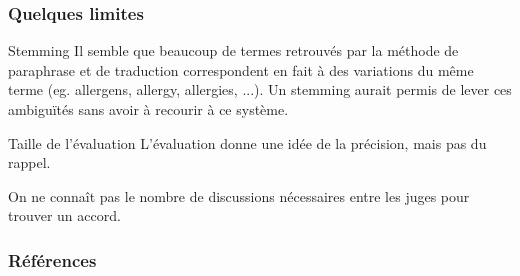 \documentclass[10pt]{beamer}
\begin{document}
\begin{frame}
  \frametitle{Quelques limites}

  \begin{block}{Stemming}
  Il semble que beaucoup de termes retrouvés par la méthode de
  paraphrase et de traduction correspondent en fait à des variations
  du même terme (eg. allergens, allergy, allergies, ...). Un stemming
  aurait permis de lever ces ambiguïtés sans avoir à recourir à ce système.
  \end{block}
  \begin{block}{Taille de l'évaluation}
    L'évaluation donne une idée de la précision, mais pas du rappel.
    
    On ne connaît pas le nombre de discussions nécessaires entre les
    juges pour trouver un accord.
  \end{block}
\end{frame}


\begin{frame}[allowbreaks]
  \frametitle{Références}
  
  
\end{frame}
\end{document}
